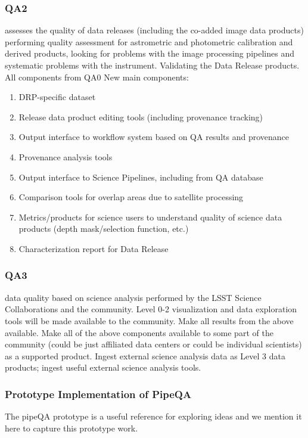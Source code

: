 \subsubsection{QA2}
assesses the quality of data releases (including the co-added image data products) performing quality assessment for astrometric and photometric calibration and derived products, looking for problems with the image processing pipelines and systematic problems with the instrument.
Validating the Data Release products.
All components from QA0
New main components:
\begin{enumerate}
\item DRP-specific dataset
\item Release data product editing tools (including provenance tracking)
\item Output interface to workflow system based on QA results and provenance
\item Provenance analysis tools
\item Output interface to Science Pipelines, including from QA database
\item Comparison tools for overlap areas due to satellite processing
\item Metrics/products for science users to understand quality of science data products (depth mask/selection function, etc.)
\item Characterization report for Data Release
\end{enumerate}

\subsubsection{QA3}
data quality based on science analysis performed by the LSST Science Collaborations and the community. Level 0-2 visualization and data exploration tools will be made available to the community.
Make all results from the above available. Make all of the above components available to some part of the community (could be just affiliated data centers or could be individual scientists) as a supported product.
Ingest external science analysis data as Level 3 data products; ingest useful external science analysis tools.

\subsubsection{Prototype Implementation of PipeQA}

The pipeQA prototype is a useful reference for exploring ideas and we mention
it here to capture this prototype work.

